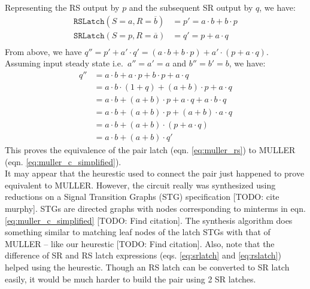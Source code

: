 Representing the RS output by $p$ and the subsequent SR output by $q$,
we have:
\begin{equation}\label{eq:muller_rs}
\begin{split}
	\texttt{RSLatch}(S=a, R=\overline{b}) &= p' = a \cdot b + b \cdot p \\
	\texttt{SRLatch}(S=p, R=\overline{a}) &= q' = p + a \cdot q \\
\end{split}
\end{equation}
From above, we have $q'' = p' + a' \cdot q' = (a \cdot b + b \cdot p) + 
a' \cdot (p + a \cdot q)$. 
Assuming input steady state i.e.\ $a'' = a' = a$ and $b'' = b' = b$, we have:
\begin{equation}
\begin{split}
	q''& = a \cdot b + a \cdot p + b \cdot p + a \cdot q\\
	&= a \cdot b \cdot (1 + q) + (a + b ) \cdot p + a \cdot q\\
	&= a \cdot b + (a + b ) \cdot p + a \cdot q + a \cdot b \cdot q\\
	&= a \cdot b + (a + b ) \cdot p + (a + b) \cdot a \cdot q\\
	&= a \cdot b + (a + b ) \cdot (p + a \cdot q)\\
	&= a \cdot b + (a + b ) \cdot q'
\end{split}
\end{equation}
This proves the equivalence of the pair latch (eqn. \ref{eq:muller_rs}) to MULLER
(eqn. \ref{eq:muller_c_simplified}).
\\
It may appear that the heurestic used to connect the pair just happened to
prove equivalent to MULLER. 
However, the circuit really was synthesized using reductions on a 
Signal Transition Graphs (STG) specification [TODO: cite murphy]. 
STGs are directed graphs with nodes corresponding to minterms in eqn.
\ref{eq:muller_c_simplified} [TODO: Find citation]. 
The synthesis algorithm does something similar to matching leaf nodes of the
latch STGs with that of MULLER -- like our heurestic [TODO: Find
citation]. 
Also, note that the difference of SR and RS latch expressions (eqs.
\ref{eq:srlatch} and \ref{eq:rslatch}) helped using the heurestic. 
Though an RS latch can be converted to SR latch easily, it would be much harder
to build the pair using 2 SR latches.
